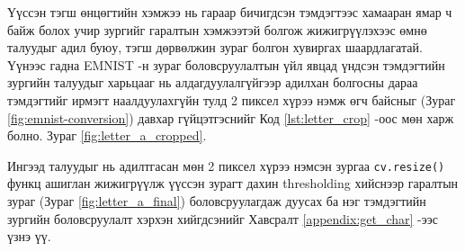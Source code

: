 Үүссэн тэгш өнцөгтийн хэмжээ нь гараар бичигдсэн тэмдэгтээс хамааран ямар ч байж болох учир зургийг гаралтын хэмжээтэй болгож жижигрүүлэхээс өмнө талуудыг адил буюу, тэгш дөрвөлжин зураг болгон хувиргах шаардлагатай. Үүнээс гадна EMNIST -н зураг боловсруулалтын үйл явцад үндсэн тэмдэгтийн зургийн талуудыг харьцааг нь алдагдуулалгүйгээр адилхан болгосны дараа тэмдэгтийг ирмэгт наалдуулахгүйн тулд 2 пиксел хүрээ нэмж өгч байсныг (Зураг \ref{fig:emnist-conversion}) давхар гүйцэтгэснийг Код \ref{lst:letter_crop} -оос мөн харж болно. Зураг \ref{fig:letter_a_cropped}.

Ингээд талуудыг нь адилтгасан мөн 2 пиксел хүрээ нэмсэн зургаа \texttt{cv.resize()} функц ашиглан жижигрүүлж үүссэн зурагт дахин thresholding хийснээр гаралтын зураг (Зураг \ref{fig:letter_a_final}) боловсруулагдаж дуусах ба нэг тэмдэгтийн зургийн боловсруулалт хэрхэн хийгдсэнийг Хавсралт \ref{appendix:get_char} -ээс үзнэ үү.